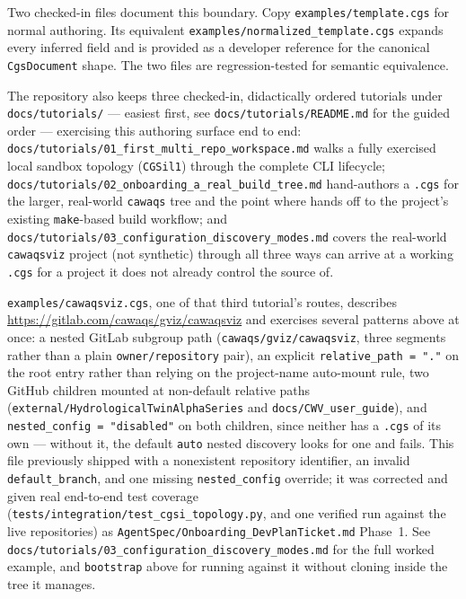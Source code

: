 Two checked-in files document this boundary. Copy
\texttt{examples/template.cgs} for normal authoring. Its equivalent
\texttt{examples/normalized\_template.cgs} expands every inferred field and is
provided as a developer reference for the canonical \texttt{CgsDocument}
shape. The two files are regression-tested for semantic equivalence.

The repository also keeps three checked-in, didactically ordered tutorials
under \texttt{docs/tutorials/} --- easiest first, see
\texttt{docs/tutorials/README.md} for the guided order --- exercising this
authoring surface end to end:
\texttt{docs/tutorials/01\_first\_multi\_repo\_workspace.md} walks a fully
exercised local sandbox topology (\texttt{CGSil1}) through the complete CLI
lifecycle;
\texttt{docs/tutorials/02\_onboarding\_a\_real\_build\_tree.md} hand-authors
a \texttt{.cgs} for the larger, real-world \texttt{cawaqs} tree and the
point where \cgscli{} hands off to the project's existing
\texttt{make}-based build workflow; and
\texttt{docs/tutorials/03\_configuration\_discovery\_modes.md} covers the
real-world \texttt{cawaqsviz} project (not synthetic) through all three
ways \cgspkg{} can arrive at a working \texttt{.cgs} for a project it does
not already control the source of.

\texttt{examples/cawaqsviz.cgs}, one of that third tutorial's routes,
describes \url{https://gitlab.com/cawaqs/gviz/cawaqsviz} and exercises
several patterns above at once: a nested GitLab subgroup path
(\texttt{cawaqs/gviz/cawaqsviz}, three segments rather than a plain
\texttt{owner/repository} pair), an explicit \texttt{relative\_path = "."}
on the root entry rather than relying on the project-name auto-mount rule,
two GitHub children mounted at non-default relative paths
(\texttt{external/HydrologicalTwinAlphaSeries} and
\texttt{docs/CWV\_user\_guide}), and \texttt{nested\_config = "disabled"}
on both children, since neither has a \texttt{.cgs} of its own --- without
it, the default \texttt{auto} nested discovery looks for one and fails.
This file previously shipped with a nonexistent repository identifier, an
invalid \texttt{default\_branch}, and one missing \texttt{nested\_config}
override; it was corrected and given real end-to-end test coverage
(\texttt{tests/integration/test\_cgsi\_topology.py}, and one verified run
against the live repositories) as \texttt{AgentSpec/Onboarding\_DevPlanTicket.md}
Phase~1. See \texttt{docs/tutorials/03\_configuration\_discovery\_modes.md}
for the full worked example, and \texttt{bootstrap} above for running
\cgspkg{} against it without cloning \cgspkg{} inside the tree it manages.

